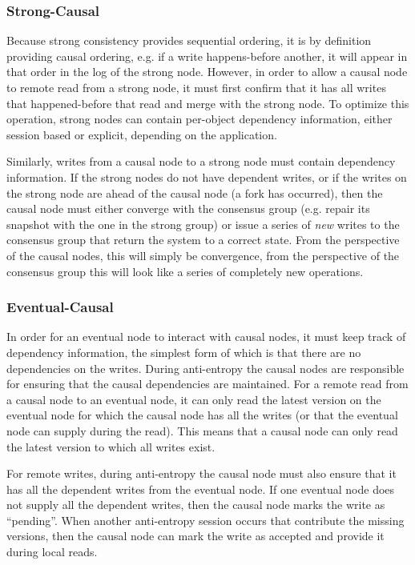 \documentclass[letterpaper,twocolumn,10pt]{article}
\begin{document}
\subsubsection{Strong-Causal}

Because strong consistency provides sequential ordering, it is by definition providing causal ordering, e.g. if a write happens-before another, it will appear in that order in the log of the strong node. However, in order to allow a causal node to remote read from a strong node, it must first confirm that it has all writes that happened-before that read and merge with the strong node. To optimize this operation, strong nodes can contain per-object dependency information, either session based or explicit, depending on the application.

Similarly, writes from a causal node to a strong node must contain dependency information. If the strong nodes do not have dependent writes, or if the writes on the strong node are ahead of the causal node (a fork has occurred), then the causal node must either converge with the consensus group (e.g. repair its snapshot with the one in the strong group) or issue a series of \textit{new} writes to the consensus group that return the system to a correct state. From the perspective of the causal nodes, this will simply be convergence, from the perspective of the consensus group this will look like a series of completely new operations.

\subsubsection{Eventual-Causal}

In order for an eventual node to interact with causal nodes, it must keep track of dependency information, the simplest form of which is that there are no dependencies on the writes. During anti-entropy the causal nodes are responsible for ensuring that the causal dependencies are maintained. For a remote read from a causal node to an eventual node, it can only read the latest version on the eventual node for which the causal node has all the writes (or that the eventual node can supply during the read). This means that a causal node can only read the latest version to which all writes exist.

For remote writes, during anti-entropy the causal node must also ensure that it has all the dependent writes from the eventual node. If one eventual node does not supply all the dependent writes, then the causal node marks the write as ``pending''. When another anti-entropy session occurs that contribute the missing versions, then the causal node can mark the write as accepted and provide it during local reads.
\end{document}
